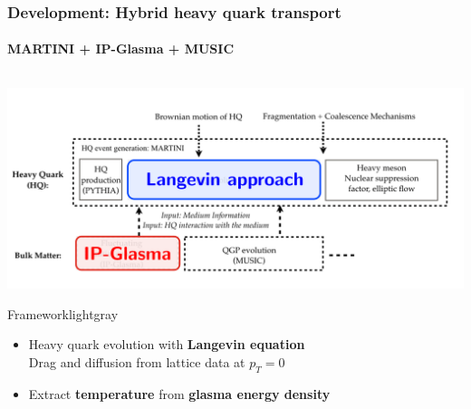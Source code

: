 \documentclass[aspectratio=169,11pt,usenames,dvipsnames]{beamer}
\begin{document}

\begin{frame}
    \frametitle{{\normalsize\color{jyured}\bfseries\sffamily Development: }Hybrid heavy quark transport}
    \framesubtitle{MARTINI + IP-Glasma + MUSIC}
    \vspace{-13pt}

    \begin{center}
        \begin{columns}
                \begin{center}\includegraphics[width=\columnwidth]{images/model_edit.png}
                    \vspace{-20pt}
                \begin{custombox2}{Framework}{lightgray}
                    \small
                    \begin{varwidth}{\textwidth}
                    \begin{itemize}\itemsep0em 
                        \item Heavy quark evolution with {\bfseries\color{blue}Langevin equation}\\
                            {\tiny Drag and diffusion from lattice data at $p_T=0$}
                        \item Extract {\bfseries\color{jyured}temperature} from {\bfseries\color{jyured}glasma energy density} 
                    \end{itemize}
                    \end{varwidth}
                \end{custombox2}

\end{center}
\end{columns}
\end{center}
\end{frame}
\end{document}
